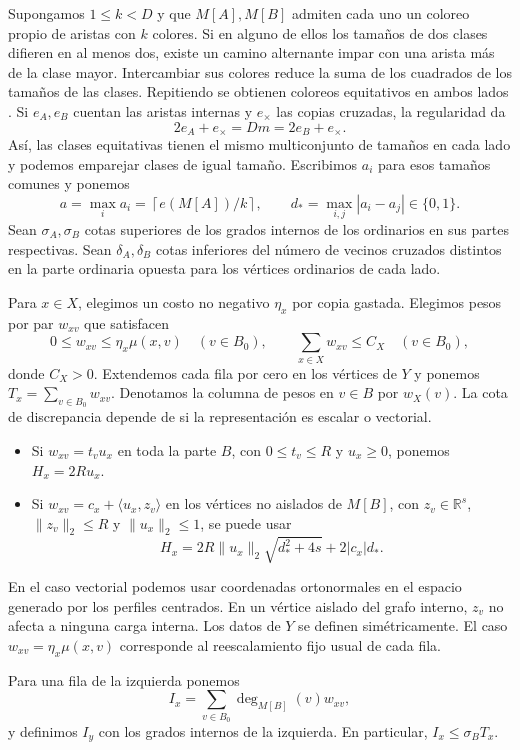 \documentclass[11pt]{article}
\begin{document}
Supongamos \(1\le k<D\) y que \(M[A],M[B]\) admiten cada uno un coloreo propio de aristas con \(k\) colores. Si en alguno de ellos los tamaños de dos clases difieren en al menos dos, existe un camino alternante impar con una arista más de la clase mayor. Intercambiar sus colores reduce la suma de los cuadrados de los tamaños de las clases. Repitiendo se obtienen coloreos equitativos en ambos lados \cite{McDiarmid,CariolaroFu}. Si \(e_A,e_B\) cuentan las aristas internas y \(e_\times\) las copias cruzadas, la regularidad da
\[
 2e_A+e_\times=Dm=2e_B+e_\times.
\]
Así, las clases equitativas tienen el mismo multiconjunto de tamaños en cada lado y podemos emparejar clases de igual tamaño. Escribimos \(a_i\) para esos tamaños comunes y ponemos
\[
 a=\max_i a_i=\left\lceil e(M[A])/k\right\rceil,\qquad
 d_*=\max_{i,j}|a_i-a_j|\in\{0,1\}.
\]
Sean \(\sigma_A,\sigma_B\) cotas superiores de los grados internos de los ordinarios en sus partes respectivas. Sean \(\delta_A,\delta_B\) cotas inferiores del número de vecinos cruzados distintos en la parte ordinaria opuesta para los vértices ordinarios de cada lado.

Para \(x\in X\), elegimos un costo no negativo \(\eta_x\) por copia gastada. Elegimos pesos por par \(w_{xv}\) que satisfacen
\[
 0\le w_{xv}\le \eta_x\mu(x,v)\quad (v\in B_0),\qquad
 \sum_{x\in X}w_{xv}\le C_X\quad(v\in B_0),
\]
donde \(C_X>0\). Extendemos cada fila por cero en los vértices de \(Y\) y ponemos \(T_x=\sum_{v\in B_0}w_{xv}\). Denotamos la columna de pesos en \(v\in B\) por \(w_X(v)\). La cota de discrepancia depende de si la representación es escalar o vectorial.
\begin{itemize}
\item Si \(w_{xv}=t_v u_x\) en toda la parte \(B\), con \(0\le t_v\le R\) y \(u_x\ge0\), ponemos \(H_x=2R u_x\).
\item Si \(w_{xv}=c_x+\langle u_x,z_v\rangle\) en los vértices no aislados de \(M[B]\), con \(z_v\in\mathbb R^s\), \(\|z_v\|_2\le R\) y \(\|u_x\|_2\le1\), se puede usar
\[
 H_x=2R\|u_x\|_2\sqrt{d_*^2+4s}+2|c_x|d_* .
\]
\end{itemize}
En el caso vectorial podemos usar coordenadas ortonormales en el espacio generado por los perfiles centrados. En un vértice aislado del grafo interno, \(z_v\) no afecta a ninguna carga interna. Los datos de \(Y\) se definen simétricamente. El caso \(w_{xv}=\eta_x\mu(x,v)\) corresponde al reescalamiento fijo usual de cada fila.

Para una fila de la izquierda ponemos
\[
 I_x=\sum_{v\in B_0}\deg_{M[B]}(v)w_{xv},
\]
y definimos \(I_y\) con los grados internos de la izquierda. En particular, \(I_x\le\sigma_B T_x\).
\end{document}
